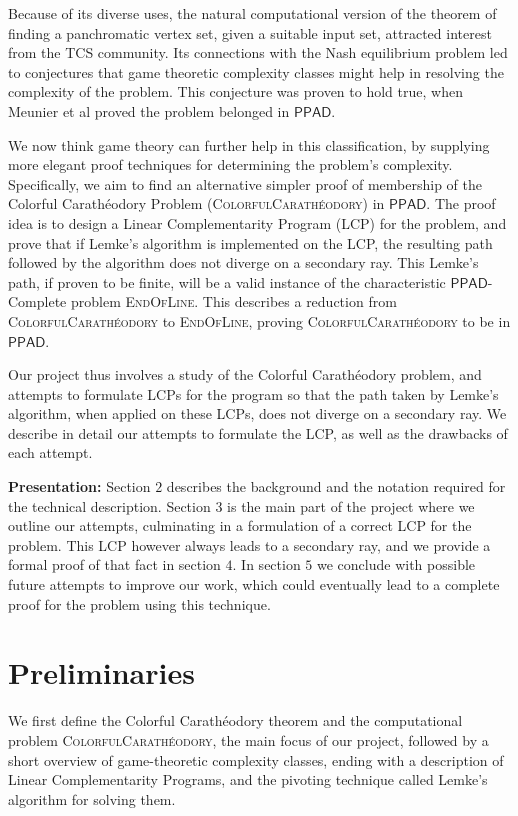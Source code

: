 \documentclass[a4paper,11pt]{article}
\def\cc#1{\mathsf{#1}}
\def\PPAD{\ensuremath{\cc{PPAD}}\xspace}
\def\problem#1{\textsc{#1}}
\def\EOL{\problem{EndOfLine}\xspace}
\def\CC{Colorful Carath\'eodory }
\def\CCP{\problem{ColorfulCarath\'eodory}\xspace}
\begin{document}
\par Because of its diverse uses, the natural computational version of the theorem of finding a panchromatic vertex set, given a suitable input set, attracted interest from the TCS community. Its connections with the Nash equilibrium problem led to conjectures that game theoretic complexity classes might help in resolving the complexity of the problem. This conjecture was proven to hold true, when Meunier et al proved the problem belonged in \PPAD \cite{CCP_PPAD}. 

\par We now think game theory can further help in this classification, by supplying more elegant proof techniques for determining the problem's complexity. Specifically, we aim to find an alternative simpler proof of membership of the \CC Problem (\CCP) in \PPAD. The proof idea is to design a Linear Complementarity Program (LCP) for the problem, and prove that if Lemke's algorithm is implemented on the LCP, the resulting path followed by the algorithm does not diverge on a secondary ray. This Lemke's path, if proven to be finite, will be a valid instance of the characteristic \PPAD-Complete problem \EOL. This describes a reduction from \CCP to \EOL, proving \CCP to be in \PPAD.

\par Our project thus involves a study of the \CC problem, and attempts to formulate LCPs for the program so that the path taken by Lemke's algorithm, when applied on these LCPs, does not diverge on a secondary ray. We describe in detail our attempts to formulate the LCP, as well as the drawbacks of each attempt. 

\textbf{Presentation:} Section $2$ describes the background and the notation required for the technical description. Section $3$ is the main part of the project where we outline our attempts, culminating in a formulation of a correct LCP for the problem. This LCP however always leads to a secondary ray, and we provide a formal proof of that fact in section $4$. In section $5$ we conclude with possible future attempts to improve our work, which could eventually lead to a complete proof for the problem using this technique.   

\section{Preliminaries}

\par We first define the \CC theorem and the computational problem \CCP, the main focus of our project, followed by a short overview of game-theoretic complexity classes, ending with a description of Linear Complementarity Programs, and the pivoting technique called Lemke's algorithm for solving them.
\end{document}
